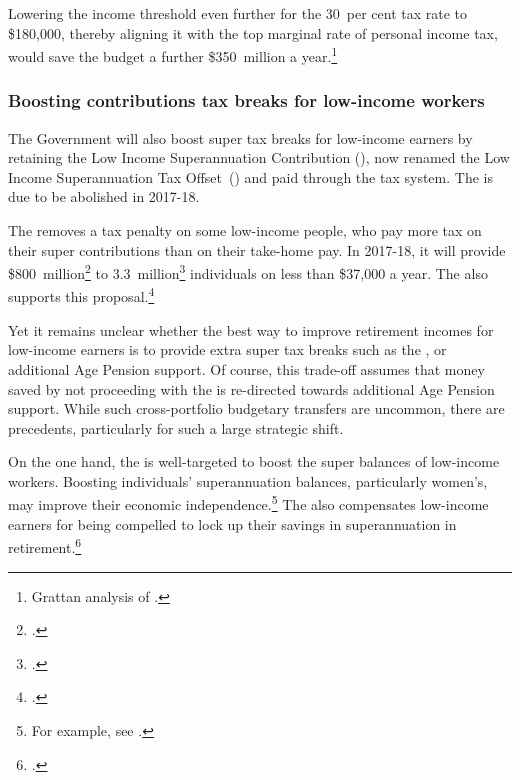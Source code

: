 \documentclass[continuous]{grattan}\usepackage[]{graphicx}\usepackage[]{color}
\begin{document}
Lowering the income threshold even further for the 30~per cent tax rate to \$180,000, thereby aligning it with the top marginal rate of personal income tax, would save the budget a further \$350~million a year.\footnote{Grattan analysis of \textcite{ATO2016SampleFile1314}.} 

\subsubsection{Boosting contributions tax breaks for low-income workers}\label{subsec:boosting-contributions-tax-breaks-for-low-income-workers}

The Government will also boost super tax breaks for low-income earners by retaining the Low Income Superannuation Contribution (\LISC{}), now renamed the Low Income Superannuation Tax Offset~(\LISTO{}) and paid through the tax system. 
The \LISC{} is due to be abolished in 2017-18. %







The \LISTO{} removes a tax penalty on some low\nobreakdash-income people, who pay more tax on their super contributions than on their take-home pay. %
In 2017-18, it will provide \$800~million\footcite[][28]{BudgetPapers201617}  to 3.3~million\footcite[][Fact Sheet No.~06]{Budget-2016-17-Super-fact-sheets} individuals on less than \$37,000 a year. 
The \ALP{} also supports this proposal.\footcite{Bowen-2016-Labors-plan-for-super-not-retrospective}

Yet it remains unclear whether the best way to improve retirement incomes for low-income earners is to provide extra super tax breaks such as the \LISTO{}, or additional Age Pension support. 
Of course, this trade-off assumes that money saved by not proceeding with the \LISTO{} is re-directed towards additional Age Pension support. 
While such cross-portfolio budgetary transfers are uncommon, there are precedents, particularly for such a large strategic shift. 

On the one hand, the \LISTO{} is well-targeted to boost the super balances of low-income workers. 
Boosting individuals’ superannuation balances, particularly women's, may improve their economic independence.\footnote{For example, see \textcite[][90--91]{Senate-Ref-Committee-2016-Achieving-econ-security-women-retirement}.} 
The \LISTO{} also compensates low-income earners for being compelled to lock up their savings in superannuation in retirement.\footcite[][17]{DaleyCoatesWoodEtAl2015Super}   
\end{document}
